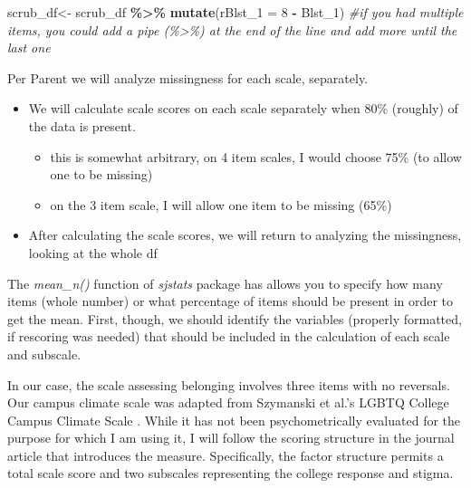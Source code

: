 \documentclass[
  11pt,
]{book}
\newenvironment{Shaded}{\begin{snugshade}}{\end{snugshade}}
\newcommand{\AttributeTok}[1]{\textcolor[rgb]{0.27,0.27,0.27}{#1}}
\newcommand{\CommentTok}[1]{\textcolor[rgb]{0.37,0.37,0.37}{\textit{#1}}}
\newcommand{\DecValTok}[1]{\textcolor[rgb]{0.06,0.06,0.06}{#1}}
\newcommand{\FunctionTok}[1]{\textcolor[rgb]{0.27,0.27,0.27}{\textbf{#1}}}
\newcommand{\NormalTok}[1]{#1}
\newcommand{\OtherTok}[1]{\textcolor[rgb]{0.37,0.37,0.37}{#1}}
\newcommand{\SpecialCharTok}[1]{\textcolor[rgb]{0.43,0.43,0.43}{\textbf{#1}}}
\providecommand{\tightlist}{%
  \setlength{\itemsep}{0pt}\setlength{\parskip}{0pt}}
\begin{document}
\begin{Shaded}
\begin{Highlighting}[]
\NormalTok{scrub\_df}\OtherTok{\textless{}{-}}\NormalTok{ scrub\_df }\SpecialCharTok{\%\textgreater{}\%}
  \FunctionTok{mutate}\NormalTok{(}\AttributeTok{rBlst\_1 =} \DecValTok{8} \SpecialCharTok{{-}}\NormalTok{ Blst\_1) }\CommentTok{\#if you had multiple items, you could add a pipe (\%\textgreater{}\%) at the end of the line and add more until the last one}
\end{Highlighting}
\end{Shaded}

Per Parent \citeyearpar{parent_handling_2013} we will analyze missingness for each scale, separately.

\begin{itemize}
\tightlist
\item
  We will calculate scale scores on each scale separately when 80\% (roughly) of the data is present.

  \begin{itemize}
  \tightlist
  \item
    this is somewhat arbitrary, on 4 item scales, I would choose 75\% (to allow one to be missing)
  \item
    on the 3 item scale, I will allow one item to be missing (65\%)
  \end{itemize}
\item
  After calculating the scale scores, we will return to analyzing the missingness, looking at the whole df
\end{itemize}

The \emph{mean\_n()} function of \emph{sjstats} package has allows you to specify how many items (whole number) or what percentage of items should be present in order to get the mean. First, though, we should identify the variables (properly formatted, if rescoring was needed) that should be included in the calculation of each scale and subscale.

In our case, the scale assessing belonging \citep{bollen_perceived_1990, hurtado_effects_1997} involves three items with no reversals. Our campus climate scale was adapted from Szymanski et al.'s LGBTQ College Campus Climate Scale \citep{szymanski_perceptions_2020}. While it has not been psychometrically evaluated for the purpose for which I am using it, I will follow the scoring structure in the journal article that introduces the measure. Specifically, the factor structure permits a total scale score and two subscales representing the college response and stigma.
\end{document}
